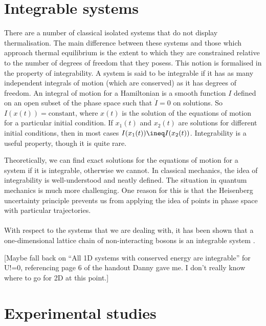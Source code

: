 \documentclass[a4paper,10pt]{article}
\begin{document}
\section{Integrable systems}
There are a number of classical isolated systems that do not display thermalisation. The main difference between these systems and those which approach thermal equilibrium is the extent to which
they are constrained relative to the number of degrees of freedom that they posess. This notion is formalised in the property of integrability. A system is said to be integrable if it has  as 
many independent integrals of motion (which are conserved) as it has degrees of freedom. An integral of motion for a Hamiltonian is a smooth function $I$ defined on an open subset of the 
phase space such that $\dot{I}=0$ on solutions. So $I(x(t))=\text{constant}$, where $x(t)$ is the solution of the equations of motion
for a particular initial condition. If $x_1(t)$ and $x_2(t)$ are solutions for different initial conditions, then in most cases $I(x_1(t))\ineq I(x_2(t))$.
Integrability is a useful property, though it is quite rare. 

\ne Theoretically, we can find exact solutions for the equations of motion for a system if it is integrable, otherwise we cannot. 
In classical mechanics, the idea of integrability is well-understood and neatly defined. The situation in quantum mechanics is much more challenging. One reason for this is that 
the Heisenberg uncertainty principle prevents us from applying the idea of points in phase space with particular trajectories. 
\\\\
With respect to the systems that we are dealing with, it has been shown that a one-dimensional lattice chain of non-interacting bosons is an integrable system \cite{Rigol2007}. 



 [Maybe fall back on ``All 1D systems with conserved energy are integrable'' for U!=0, referencing page 6 of the handout Danny gave me. I don't really know where 
to go for 2D at this point.]


\section{Experimental studies}
\end{document}
